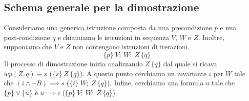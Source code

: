 \subsection{Schema generale per la dimostrazione}
Consideriamo una generica istruzione composta da una precondizione $p$ e una
post-condizione $q$ e chiamiamo le istruzioni in sequenza $V$, $W$ e $Z$.
Inoltre, supponiamo che $V$ e $Z$ non contengano istruzioni di iterazioni.
\begin{equation}
    \{p\} \ V; \ W; \ Z \ \{q\}
\end{equation}
Il processo di dimostrazione inizia analizzando $Z \ \{q\}$ dal quale si ricava
$wp(Z, q) \equiv s$ ($\{s\} \ Z \ \{q\}$). A questo punto cerchiamo un invariante
$i$ per $W$ tale che $(i \land \lnot B) \implies s$ ($\{i\} \ W; \ Z \ \{q\}$).
Infine, cerchiamo una formula $u$ tale che $\{p\} \lor \{u\}$ è $u \implies i$
($\{p\} \ V; \ W; \ Z \ \{q\}$).
